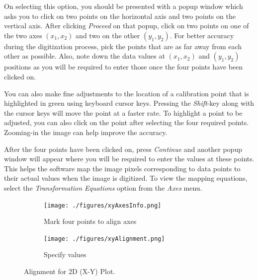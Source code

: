 \documentclass[letterpaper, 10pt]{article}
\begin{document}
On selecting this option, you should be presented with a popup window which asks you to click on two points on the horizontal axis and two points on the vertical axis. After clicking \emph{Proceed} on that popup, click on two points on one of the two axes $(x_1, x_2)$ and two on the other $(y_1, y_2)$. For better accuracy during the digitization process, pick the points that are as far away from each other as possible. Also, note down the data values at $(x_1, x_2)$ and $(y_1, y_2)$ positions as you will be required to enter those once the four points have been clicked on. 

You can also make fine adjustments to the location of a calibration point that is highlighted in green using keyboard cursor keys. Pressing the \emph{Shift}-key along with the cursor keys will move the point at a faster rate. To highlight a point to be adjusted, you can also click on the point after selecting the four required points. Zooming-in the image can help improve the accuracy.

After the four points have been clicked on, press \emph{Continue} and another popup window will appear where you will be required to enter the values at these points. This helps the software map the image pixels corresponding to data points to their actual values when the image is digitized. To view the mapping equations, select the \emph{Transformation Equations} option from the \emph{Axes} menu.

\begin{figure}
\centering
{\begin{subfigure}[b]{0.4\textwidth}
\texttt{[image: ./figures/xyAxesInfo.png]}
\caption{Mark four points to align axes}
\end{subfigure}
\begin{subfigure}[b]{0.4\textwidth}
\texttt{[image: ./figures/xyAlignment.png]}
\caption{Specify values}
\end{subfigure}}
\caption{Alignment for 2D (X-Y) Plot.}
\label{fig:xyAlignment}
\end{figure}
\end{document}
